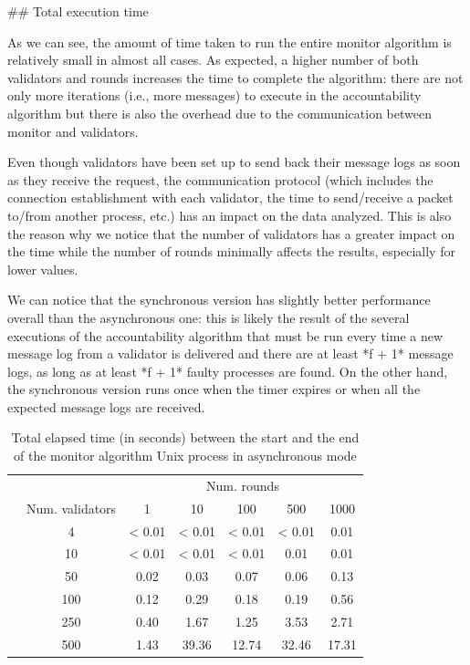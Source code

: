 \documentclass[a4paper,11pt,oneside]{report}
\begin{document}
\begin{markdown}

## Total execution time

As we can see, the amount of time taken to run the entire monitor algorithm is relatively small in almost all cases. 
As expected, a higher number of both validators and rounds increases the time to complete the algorithm: there are not only more iterations (i.e., more messages) to execute in the accountability algorithm but there is also the overhead due to the communication between monitor and validators.

Even though validators have been set up to send back their message logs as soon as they receive the request, the communication protocol (which includes the connection establishment with each validator, the time to send/receive a packet to/from another process, etc.) has an impact on the data analyzed. 
This is also the reason why we notice that the number of validators has a greater impact on the time while the number of rounds minimally affects the results, especially for lower values.

We can notice that the synchronous version has slightly better performance overall than the asynchronous one: this is likely the result of the several executions of the accountability algorithm that must be run every time a new message log from a validator is delivered and there are at least *f + 1* message logs, as long as at least *f + 1* faulty processes are found. 
On the other hand, the synchronous version runs once when the timer expires or when all the expected message logs are received.   

\end{markdown}

\begin{table}[]
\centering
\begin{tabular}{l|c|c|c|c|c|c|}
\cline{2-7}
                  &  & \multicolumn{5}{c|}{Num. rounds} \\ \cline{2-7} 
\multirow{7}{*}{} & Num. validators & 1   & 10   & 100  & 500  & 1000  \\ \cline{2-7} 
                  & 4               & < 0.01 & < 0.01  & < 0.01 & < 0.01 &  0.01       \\ \cline{2-7} 
                  & 10              & < 0.01   & < 0.01   & < 0.01  & 0.01  &  0.01     \\ \cline{2-7} 
                  & 50              & 0.02    & 0.03     & 0.07      &  0.06    & 0.13      \\ \cline{2-7} 
                  & 100             & 0.12    & 0.29     & 0.18     & 0.19     &   0.56    \\ \cline{2-7} 
                  & 250             & 0.40    &  1.67    & 1.25     & 3.53      & 2.71      \\ \cline{2-7} 
                  & 500             &  1.43   &  39.36    & 12.74     &  32.46    &  17.31     \\ \cline{2-7} 
\end{tabular}
\caption{Total elapsed time (in seconds) between the start and the end of the monitor algorithm Unix process in asynchronous mode}
\end{table}
\end{document}
